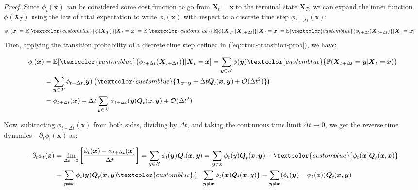\documentclass{article}
\newcommand{\bluetext}[1]{\textcolor{customblue}{#1}}
\begin{document}
\textit{Proof.} Since $\phi_t(\boldsymbol{x})$ can be considered some cost function to go from $\boldsymbol{X}_t=\boldsymbol{x}$ to the terminal state $\boldsymbol{X}_T$, we can expand the inner function $\phi(\boldsymbol{X}_T)$ using the law of total expectation to write $\phi_t(\boldsymbol{x})$ with respect to a discrete time step $\phi_{t+\Delta t}(\boldsymbol{x})$: 
\begin{align}
    \phi_t(\boldsymbol{x})&=\mathbb{E}[\bluetext{\phi(\boldsymbol{X}_T)}|\boldsymbol{X}_t=\boldsymbol{x}]=\mathbb{E}[\bluetext{\mathbb{E}[\phi(\boldsymbol{X}_T)|\boldsymbol{X}_{t+\Delta t}]}|\boldsymbol{X}_t=\boldsymbol{x}]=\mathbb{E}[\bluetext{\phi_{t+\Delta t}(\boldsymbol{X}_{t+\Delta t})}|\boldsymbol{X}_t=\boldsymbol{x}]
\end{align}
Then, applying the transition probability of a discrete time step defined in (\ref{eq:ctmc-transition-prob}), we have:
\begin{small}
\begin{align}
    \phi_t(\boldsymbol{x})&=\mathbb{E}[\bluetext{\phi_{t+\Delta t}(\boldsymbol{X}_{t+\Delta t})}|\boldsymbol{X}_t=\boldsymbol{x}]=\sum_{\boldsymbol{y}\in \mathcal{X}}\phi(\boldsymbol{y})\bluetext{\mathbb{P}(\boldsymbol{X}_{t+\Delta t}=\boldsymbol{y}|\boldsymbol{X}_t=\boldsymbol{x})}\nonumber\\
    &=\sum_{\boldsymbol{y}\in \mathcal{X}}\phi_{t+\Delta t}(\boldsymbol{y})\left(\bluetext{\boldsymbol{1}_{\boldsymbol{x}=\boldsymbol{y}}+\Delta t\boldsymbol{Q}_t(\boldsymbol{x}, \boldsymbol{y})+\mathcal{O}(\Delta t^2)}\right)\nonumber\\
    &=\phi_{t+\Delta t}(\boldsymbol{x})+\Delta t\sum_{\boldsymbol{y}\in \mathcal{X}}\phi_{t+\Delta t}(\boldsymbol{y})\boldsymbol{Q}_t(\boldsymbol{x}, \boldsymbol{y})+\mathcal{O}(\Delta t^2)
\end{align}
\end{small}
Now, subtracting $\phi_{t+\Delta t}(\boldsymbol{x})$ from both sides, dividing by $\Delta t$,  and taking the continuous time limit $\Delta t\to 0$, we get the reverse time dynamics $-\partial_t\phi_t(\boldsymbol{x})$ as:
\begin{small}
\begin{align}
    -\partial_t\phi_t(\boldsymbol{x})&=\lim_{\Delta t\to 0}\left[\frac{\phi_t(\boldsymbol{x})-\phi_{t+\Delta t}(\boldsymbol{x})}{\Delta t}\right]=\sum_{\boldsymbol{y}\in \mathcal{X}}\phi_{t}(\boldsymbol{y})\boldsymbol{Q}_t(\boldsymbol{x}, \boldsymbol{y})=\sum_{\boldsymbol{y}\neq \boldsymbol{x}}\phi_t(\boldsymbol{y})\boldsymbol{Q}_t(\boldsymbol{x}, \boldsymbol{y})+\bluetext{\phi_t(\boldsymbol{x})\boldsymbol{Q}_t(\boldsymbol{x}, \boldsymbol{x})}\nonumber\\
    &=\sum_{\boldsymbol{y}\neq \boldsymbol{x}}\phi_t(\boldsymbol{y})\boldsymbol{Q}_t(\boldsymbol{x}, \boldsymbol{y})\bluetext{-\sum_{\boldsymbol{y}\neq \boldsymbol{x}}\phi_t(\boldsymbol{x})\boldsymbol{Q}_t(\boldsymbol{x}, \boldsymbol{y})}=\sum_{\boldsymbol{y}\neq \boldsymbol{x}}(\phi_t(\boldsymbol{y})-\phi_t(\boldsymbol{x}))\boldsymbol{Q}_t(\boldsymbol{x}, \boldsymbol{y})\label{eq:ctmc-kolmogorov-bwd-proof}
\end{align}
\end{small}
\end{document}
